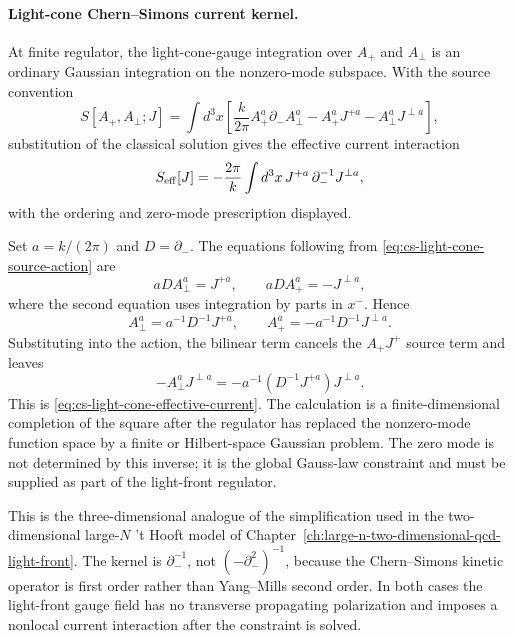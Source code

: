 \paragraph{Light-cone Chern--Simons current kernel.}
At finite regulator, the light-cone-gauge integration over \(A_+\) and
\(A_\perp\) is an ordinary Gaussian integration on the nonzero-mode subspace.
With the source convention
\begin{equation}
  S[A_+,A_\perp;J]
  =
  \int d^3x\left[
  \frac{k}{2\pi}A_+^a\partial_-A_\perp^a
  -A_+^aJ^{+a}-A_\perp^aJ^{\perp a}\right],
  \label{eq:cs-light-cone-source-action}
\end{equation}
substitution of the classical solution gives the effective current interaction
\begin{equation}
  S_{\rm eff}[J]
  =
  -\frac{2\pi}{k}
  \int d^3x\,
  J^{+a}\,\partial_-^{-1}J^{\perp a},
  \label{eq:cs-light-cone-effective-current}
\end{equation}
with the ordering and zero-mode prescription displayed.

Set \(a=k/(2\pi)\) and \(D=\partial_-\).  The equations following from
\eqref{eq:cs-light-cone-source-action} are
\[
  aD A_\perp^a=J^{+a},\qquad
  aD A_+^a=-J^{\perp a},
\]
where the second equation uses integration by parts in \(x^-\).  Hence
\[
  A_\perp^a=a^{-1}D^{-1}J^{+a},
  \qquad
  A_+^a=-a^{-1}D^{-1}J^{\perp a}.
\]
Substituting into the action, the bilinear term cancels the \(A_+J^+\) source
term and leaves
\[
  -A_\perp^aJ^{\perp a}
  =
  -a^{-1}(D^{-1}J^{+a})J^{\perp a}.
\]
This is \eqref{eq:cs-light-cone-effective-current}.  The calculation is a
finite-dimensional completion of the square after the regulator has replaced
the nonzero-mode function space by a finite or Hilbert-space Gaussian problem.
The zero mode is not determined by this inverse; it is the global Gauss-law
constraint and must be supplied as part of the light-front regulator.

This is the three-dimensional analogue of the simplification used in the
two-dimensional large-\(N\) 't Hooft model of
Chapter~\ref{ch:large-n-two-dimensional-qcd-light-front}.  The kernel is
\(\partial_-^{-1}\), not \((-\partial_-^2)^{-1}\), because the Chern--Simons
kinetic operator is first order rather than Yang--Mills second order.  In both
cases the light-front gauge field has no transverse propagating polarization
and imposes a nonlocal current interaction after the constraint is solved.

